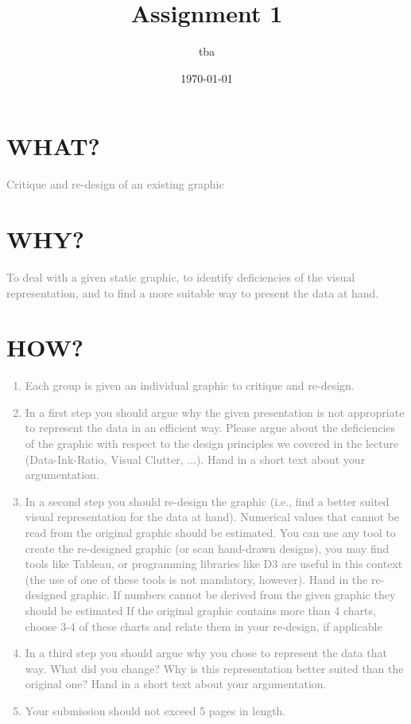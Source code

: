 \documentclass{article}
\title{Assignment 1}
\author{tba}
\date{\today}
\begin{document}
\maketitle


\section{WHAT?}

\textcolor{gray}{Critique and re-design of an existing graphic}

\section{WHY?}

\textcolor{gray}{To deal with a given static graphic, to identify deficiencies
of the visual representation, and to find a more suitable way to present the
data at hand.}

\section{HOW?}

\textcolor{gray}{
\begin{enumerate}
		\item Each group is given an individual graphic to critique and re-design.
		\item In a first step you should argue why the given presentation is not
			appropriate to represent the data in an efficient way. Please argue about
			the deficiencies of the graphic with respect to the design principles we
			covered in the lecture (Data-Ink-Ratio, Visual Clutter, ...).  Hand in a
			short text about your argumentation.
		\item In a second step you should re-design the graphic (i.e., find a better
			suited visual representation for the data at hand). Numerical values that
			cannot be read from the original graphic should be estimated. You can use
			any tool to create the re-designed graphic (or scan hand-drawn designs),
			you may find tools like Tableau, or programming libraries like D3 are
			useful in this context (the use of one of these tools is not mandatory,
			however). Hand in the re-designed graphic. If numbers cannot be derived
			from the given graphic they should be estimated If the original graphic
			contains more than 4 charts, choose 3-4 of these charts and relate them in
			your re-design, if applicable
		\item In a third step you should argue why you chose to represent the data
			that way. What did you change? Why is this representation better suited
			than the original one? Hand in a short text about your argumentation.
    \item Your submission should not exceed 5 pages in length.
\end{enumerate}}
\end{document}
